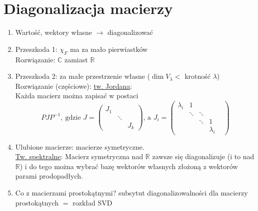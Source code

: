 \section{Diagonalizacja macierzy} 
\begin{enumerate} 
    \item Wartość, wektory własne $\to$ diagonalizować 
    \item Przeszkoda 1: $\chi_F$ ma za mało pierwiastków \\ 
        Rozwiązanie: $\mathbb C$ zamiast $\mathbb R$
    \item Przeszkoda 2: za małe przestrzenie własne ($\dim V_\lambda < $ krotność $\lambda$)\\
        Rozwiązanie (częściowe): \underline{tw. Jordana}: \\
        Każda macierz można zapisać w postaci 
        \[ PJP^{-1}, \ \text{gdzie } J = \begin{pmatrix} J_1 & & \\ & \ddots & \\ & & J_k \end{pmatrix}
        \text{, a } J_i = \begin{pmatrix} \lambda_i & 1 & & & \\ & \ddots & \ddots & & \\ 
            & & \ddots & 1 \\ & & &  \lambda_i \end{pmatrix}
        \]
    \item Ulubione macierze: macierze symetryczne. \\
        \underline{Tw. spektralne}: Macierz symetryczna nad $\mathbb R$ zawsze się diagonalizuje
        (i to nad $\mathbb R$) i do tego można wybrać bazę wektorów własnych złożoną z wektorów 
        parami prodopadłych.
    \item Co z macierzami prostokątnymi? subsytut diagonalizowalności dla macierzy prostokątnych $=$ rozkład SVD
\end{enumerate} 
